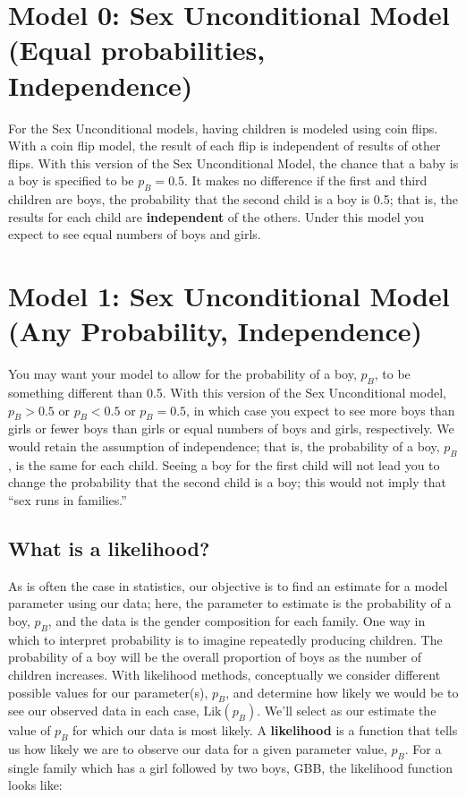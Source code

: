 \documentclass[
]{krantz}
\newcommand{\lik}{\mathrm{Lik}}
\begin{document}
\hypertarget{model-0-sex-unconditional-model-equal-probabilities-independence}{%
\section{Model 0: Sex Unconditional Model (Equal probabilities, Independence)}\label{model-0-sex-unconditional-model-equal-probabilities-independence}}

For the Sex Unconditional models, having children is modeled using coin flips. With a coin flip model, the result of each flip is independent of results of other flips. With this version of the Sex Unconditional Model, the chance that a baby is a boy is specified to be \(p_B=0.5\). It makes no difference if the first and third children are boys, the probability that the second child is a boy is 0.5; that is, the results for each child are \textbf{independent}  of the others. Under this model you expect to see equal numbers of boys and girls.

\hypertarget{sex_unconditional_model}{%
\section{Model 1: Sex Unconditional Model (Any Probability, Independence)}\label{sex_unconditional_model}}

You may want your model to allow for the probability of a boy, \(p_B\), to be something different than 0.5. With this version of the Sex Unconditional model, \(p_B>0.5\) or \(p_B<0.5\) or \(p_B=0.5\), in which case you expect to see more boys than girls or fewer boys than girls or equal numbers of boys and girls, respectively. We would retain the assumption of independence; that is, the probability of a boy, \(p_B\), is the same for each child. Seeing a boy for the first child will not lead you to change the probability that the second child is a boy; this would not imply that ``sex runs in families.''

\hypertarget{what-is-a-likelihood}{%
\subsection{What is a likelihood?}\label{what-is-a-likelihood}}

As is often the case in statistics, our objective is to find an estimate for a model parameter using our data; here, the parameter to estimate is the probability of a boy, \(p_B\), and the data is the gender composition for each family. One way in which to interpret probability is to imagine repeatedly producing children. The probability of a boy will be the overall proportion of boys as the number of children increases.
With likelihood methods, conceptually we consider different possible values for our parameter(s), \(p_B\), and determine how likely we would be to see our observed data in each case, \(\lik(p_B)\). We'll select as our estimate the value of \(p_B\) for which our data is most likely. A \textbf{likelihood}  is a function that tells us how likely we are to observe our data for a given parameter value, \(p_B\). For a single family which has a girl followed by two boys, GBB, the likelihood function looks like:
\end{document}
